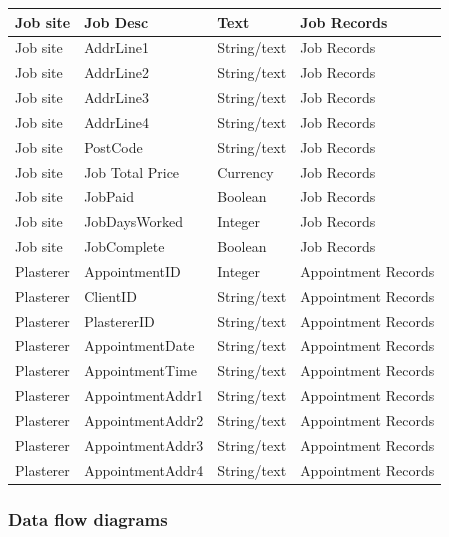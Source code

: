 \begin{flushleft}
\begin{longtable}{|p{3cm}|p{3cm}|p{3cm}|p{3cm}|}
Job site & Job Desc & Text & Job Records \\ \hline
Job site & AddrLine1 & String/text & Job Records \\ \hline
Job site & AddrLine2 & String/text & Job Records \\ \hline
Job site & AddrLine3 & String/text & Job Records \\ \hline
Job site & AddrLine4 & String/text & Job Records \\ \hline
Job site & PostCode  & String/text & Job Records \\ \hline
Job site & Job Total Price & Currency & Job Records \\ \hline
Job site & JobPaid     & Boolean & Job Records \\ \hline
Job site & JobDaysWorked & Integer & Job Records \\ \hline
Job site & JobComplete & Boolean & Job Records \\ \hline   
Plasterer & AppointmentID & Integer & Appointment Records \\ \hline
Plasterer & ClientID & String/text & Appointment Records \\ \hline 
Plasterer & PlastererID & String/text & Appointment Records \\ \hline
Plasterer & AppointmentDate & String/text & Appointment Records \\ \hline
Plasterer & AppointmentTime & String/text & Appointment Records \\ \hline
Plasterer & AppointmentAddr1 & String/text & Appointment Records \\ \hline
Plasterer & AppointmentAddr2 & String/text & Appointment Records \\ \hline
Plasterer & AppointmentAddr3 & String/text & Appointment Records \\ \hline
Plasterer & AppointmentAddr4 & String/text & Appointment Records \\ \hline







\end{longtable}





\end{flushleft}



\subsubsection{Data flow diagrams}


